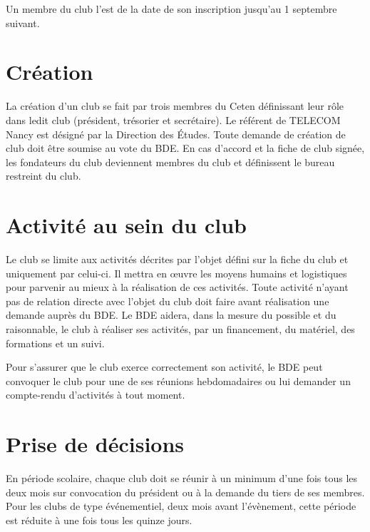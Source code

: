 \documentclass{article}
\begin{document}
\begin{multicols}{2}
{			Un membre du club l'est de la date de son inscription jusqu'au
			1 septembre suivant.

		}

		\section{Création}
\label{sec:creation}
		
		{\small
		
			La création d’un club se fait par trois membres du Ceten définissant
			leur rôle dans ledit club (président, trésorier et secrétaire). Le
			référent de TELECOM Nancy est désigné par la Direction des Études.
			Toute demande de création de club doit être soumise au vote du BDE\@.
			En cas d’accord et la fiche de club signée, les fondateurs du club
			deviennent membres du club et définissent le bureau restreint du club.
			
		}

		\section{Activité au sein du club}
\label{sec:activite_au_sein_du_club}
		
		{\small
		
			Le club se limite aux activités décrites par l’objet défini sur la
			fiche du club et uniquement par celui-ci. Il mettra en œuvre les
			moyens humains et logistiques pour parvenir au mieux à la
			réalisation de ces activités. Toute activité n’ayant pas de relation
			directe avec l’objet du club doit faire avant réalisation une
			demande auprès du BDE\@. Le BDE aidera, dans la mesure du possible et
			du raisonnable, le club à réaliser ses activités, par un 
			financement, du matériel, des formations et un suivi.

			Pour s’assurer que le club exerce correctement son activité, le BDE
			peut convoquer le club pour une de ses réunions hebdomadaires ou lui
			demander un compte-rendu d’activités à tout moment.
			
		}

		\section{Prise de décisions}
\label{sec:prise_de_decisions}
		
		{\small
		
			En période scolaire, chaque club doit se réunir à un minimum d’une
			fois tous les deux mois sur convocation du président ou à la demande
			du tiers de ses membres. Pour les clubs de type événementiel, deux
			mois avant l’évènement, cette période est réduite à une fois tous
			les quinze jours.

}
\end{multicols}
\end{document}
